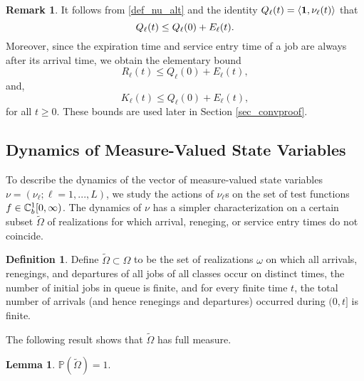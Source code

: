 \documentclass{article}
\theoremstyle{definition}
\newtheorem{lemma}[theorem]{Lemma}
\newtheorem{definition}[theorem]{Definition}
\newtheorem{remark}[theorem]{Remark}
\numberwithin{equation}{section}
\begin{document}
\begin{remark}
It follows from \eqref{def_nu_alt} and the identity $Q_\ell(t)=\langle\f1,\nu_\ell(t)\rangle$ that 
\begin{equation}\label{ineq_Qbalance}
    Q_\ell(t) \leq Q_\ell(0)+ E_\ell(t).
\end{equation}
Moreover, since the expiration time and service entry time of a job are always after its arrival time, we obtain the elementary bound
  \begin{equation}\label{elementary_bound_R}
	R_\ell(t)  \leq Q_\ell(0)+E_\ell(t),
  \end{equation}
  and,
  \begin{equation}\label{elementary_bound_K}
    K_\ell(t)\leq Q_\ell(0) + E_\ell(t),
  \end{equation}
for all $t\geq0$. These bounds are used later in Section \ref{sec_convproof}.
\end{remark}





\subsection{Dynamics of Measure-Valued State Variables}

To describe the dynamics of the vector of measure-valued state variables $\nu=(\nu_\ell;\ell=1,...,L)$, we study the actions of $\nu_\ell$s on the set of test functions $f\in\mathbb{C}_b^{1}[0,\infty)$. The dynamics of $\nu$ has a simpler characterization on a certain subset $\tilde \Omega$ of realizations for which arrival, reneging, or service entry times do not coincide. 

\begin{definition}\label{def_tomega}
Define $\tilde\Omega\subset\Omega$ to be the set of realizations $\omega$ on which all arrivals, renegings, and departures of all jobs of all classes occur on distinct times, the number of initial jobs in queue is finite, and for every finite time $t$, the total number of arrivals (and hence renegings and departures) occurred during $(0,t]$ is finite.
\end{definition}
The following result shows that $\tilde\Omega$ has full measure. 

\begin{lemma}\label{lem_tomega}
  $\mathbb{P}(\tilde\Omega)=1$.
\end{lemma}
\end{document}
